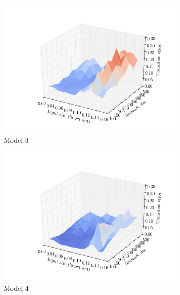 \begin{figure}[p]
\begin{subfigure}{0.48\textwidth}
    	\centering
        \includegraphics[width=\textwidth]{results/mc1_distances_size_inputs_2}
        \caption{Model $3$}
        \label{fig:mc1-size-2}
    \end{subfigure}
    \hfill
    \begin{subfigure}{0.48\textwidth}
    	\centering
        \includegraphics[width=\textwidth]{results/mc1_distances_size_inputs_3}
        \caption{Model $4$}
        \label{fig:mc1-size-3}
    \end{subfigure}
    \begin{subfigure}{0.48\textwidth}
    	\centering

\end{subfigure}
\end{figure}
